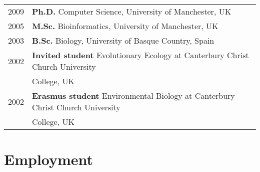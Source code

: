 \documentclass[11pt,fullpage]{article}
\begin{document}
\begin{tabular}{ll}
	2009 & {\bf Ph.D.} Computer Science, University of Manchester, UK \\
	2005 & {\bf M.Sc.} Bioinformatics, University of Manchester, UK \\
	2003 & {\bf B.Sc.} Biology, University of Basque Country, Spain \\
	2002 & {\bf Invited student} Evolutionary Ecology at Canterbury Christ Church University \\
	     & College, UK \\
	2002 & {\bf Erasmus student} Environmental Biology at Canterbury Christ Church University \\
	     & College, UK \\
\end{tabular}

\section*{Employment}

\end{document}
